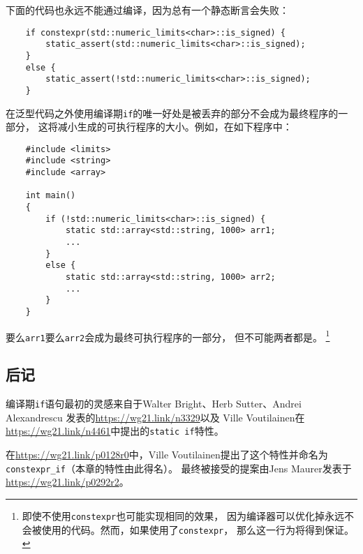 下面的代码也永远不能通过编译，因为总有一个静态断言会失败：
\begin{lstlisting}
    if constexpr(std::numeric_limits<char>::is_signed) {
        static_assert(std::numeric_limits<char>::is_signed);
    }
    else {
        static_assert(!std::numeric_limits<char>::is_signed);
    }
\end{lstlisting}
在泛型代码之外使用编译期\texttt{if}的唯一好处是被丢弃的部分不会成为最终程序的一部分，
这将减小生成的可执行程序的大小。例如，在如下程序中：
\begin{lstlisting}
    #include <limits>
    #include <string>
    #include <array>

    int main()
    {
        if (!std::numeric_limits<char>::is_signed) {
            static std::array<std::string, 1000> arr1;
            ...
        }
        else {
            static std::array<std::string, 1000> arr2;
            ...
        }
    }
\end{lstlisting}
要么\texttt{arr1}要么\texttt{arr2}会成为最终可执行程序的一部分，
但不可能两者都是。
\footnote{即使不使用\texttt{constexpr}也可能实现相同的效果，
因为编译器可以优化掉永远不会被使用的代码。然而，如果使用了\texttt{constexpr}，
那么这一行为将得到保证。}

\subsection{后记}
编译期\texttt{if}语句最初的灵感来自于Walter Bright、Herb Sutter、Andrei Alexandrescu
发表的\url{https://wg21.link/n3329}以及
Ville Voutilainen在\url{https://wg21.link/n4461}中提出的\texttt{static if}特性。

在\url{https://wg21.link/p0128r0}中，Ville Voutilainen提出了这个特性并命名为
\texttt{constexpr\_if}（本章的特性由此得名）。
最终被接受的提案由Jens Maurer发表于\url{https://wg21.link/p0292r2}。

\setcounter{footnote}{0}